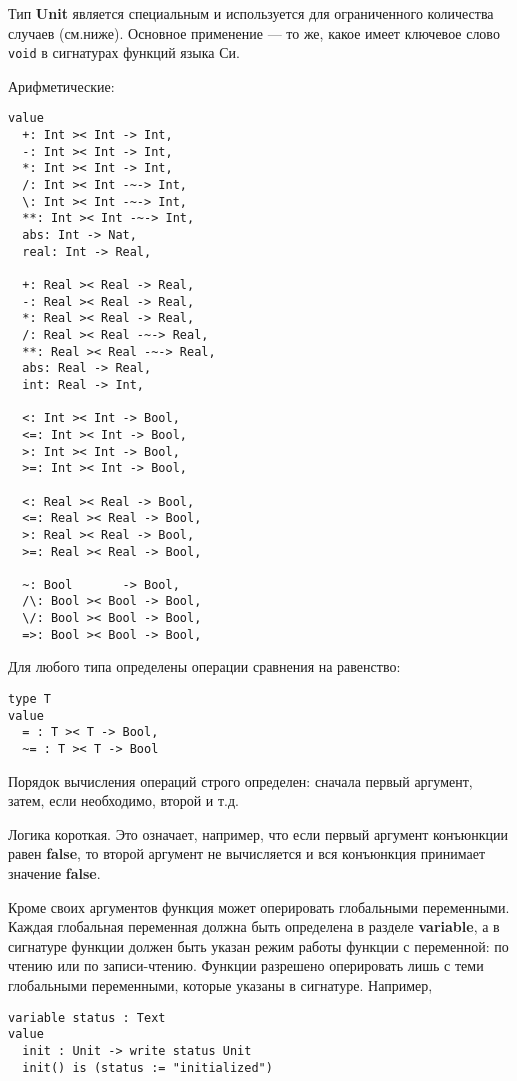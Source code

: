 Тип \textbf{Unit} является специальным и используется для ограниченного количества случаев (см.ниже). Основное применение --- то же, какое имеет ключевое слово \texttt{void} в сигнатурах функций языка Си.

Арифметические:
\begin{lstlisting}
value
  +: Int >< Int -> Int,
  -: Int >< Int -> Int,
  *: Int >< Int -> Int,
  /: Int >< Int -~-> Int,
  \: Int >< Int -~-> Int,
  **: Int >< Int -~-> Int,
  abs: Int -> Nat,
  real: Int -> Real,

  +: Real >< Real -> Real,
  -: Real >< Real -> Real,
  *: Real >< Real -> Real,
  /: Real >< Real -~-> Real,
  **: Real >< Real -~-> Real,
  abs: Real -> Real,
  int: Real -> Int,

  <: Int >< Int -> Bool,
  <=: Int >< Int -> Bool,
  >: Int >< Int -> Bool,
  >=: Int >< Int -> Bool,

  <: Real >< Real -> Bool,
  <=: Real >< Real -> Bool,
  >: Real >< Real -> Bool,
  >=: Real >< Real -> Bool,

  ~: Bool       -> Bool,
  /\: Bool >< Bool -> Bool,
  \/: Bool >< Bool -> Bool,
  =>: Bool >< Bool -> Bool,
\end{lstlisting}

Для любого типа определены операции сравнения на равенство:
\begin{lstlisting}
type T
value
  = : T >< T -> Bool,
  ~= : T >< T -> Bool
\end{lstlisting}

Порядок вычисления операций строго определен: сначала первый аргумент, затем, если необходимо, второй и т.д.

Логика короткая. Это означает, например, что если первый аргумент конъюнкции равен \textbf{false}, то второй аргумент не вычисляется и вся конъюнкция принимает значение \textbf{false}.

Кроме своих аргументов функция может оперировать глобальными переменными. Каждая глобальная переменная должна быть определена в разделе \textbf{variable}, а в сигнатуре функции должен быть указан режим работы функции с переменной: по чтению или по записи-чтению. Функции разрешено оперировать лишь с теми глобальными переменными, которые указаны в сигнатуре. Например,
\begin{lstlisting}
variable status : Text
value
  init : Unit -> write status Unit
  init() is (status := "initialized")	
\end{lstlisting}

